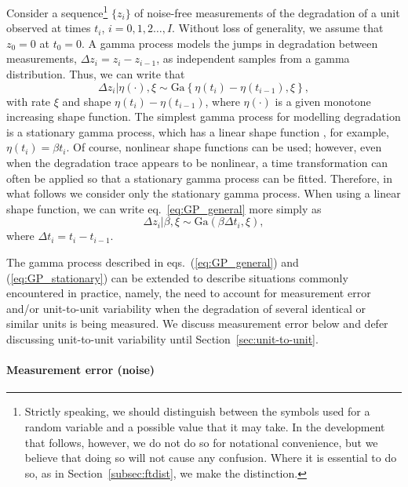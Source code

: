 \documentclass{article}
\begin{document}
Consider a sequence\footnote{Strictly speaking, we should distinguish between the symbols used for a random variable and a possible value that it may take. In the development that follows, however, we do not do so for notational convenience, but we believe that doing so will not cause any confusion. Where it is essential to do so, as in Section~\ref{subsec:ftdist}, we make the distinction.} $\{z_i\}$ of noise-free measurements of the degradation of a unit observed at times $t_i$, $i = 0, 1, 2 \ldots, I$. Without loss of generality, we assume that $z_0 = 0$ at $t_0 = 0$. A gamma process \citep{lawless_covariates_2004} models the jumps in degradation between measurements, $\Delta z_i = z_i - z_{i-1}$, as independent samples from a gamma distribution. Thus, we can write that
\begin{equation} \label{eq:GP_general}
    \Delta z_i|\eta(\cdot), \xi \sim \mbox{Ga} \left\{ \eta(t_i) - \eta(t_{i-1}), \xi \right\},
\end{equation}
with rate $\xi$ and shape $\eta(t_i) - \eta(t_{i-1})$, where $\eta(\cdot)$ is a given monotone increasing shape function. The simplest gamma process for modelling degradation is a stationary gamma process, which has a linear shape function  \citep{frenk:2007}, for example, $\eta(t_i) = \beta t_i$. Of course, nonlinear shape functions can be used; however, even when the degradation trace appears to be nonlinear, a time transformation can often be applied so that a stationary gamma process can be fitted. Therefore, in what follows we consider only the stationary gamma process. When using a linear shape function, we can write eq.~\eqref{eq:GP_general} more simply as
\begin{equation} \label{eq:GP_stationary}
    \Delta z_i| \beta, \xi \sim \mbox{Ga} \left( \beta \Delta t_i, \xi \right),
\end{equation}
where $\Delta t_i = t_i - t_{i-1}$.

The gamma process described in eqs.~(\ref{eq:GP_general}) and (\ref{eq:GP_stationary}) can be extended to describe situations commonly encountered in practice, namely, the need to account for measurement error and/or unit-to-unit variability when the degradation of several identical or similar units is being measured. We discuss measurement error below and defer discussing unit-to-unit variability until Section~\ref{sec:unit-to-unit}.

\paragraph{Measurement error (noise)}
\end{document}
